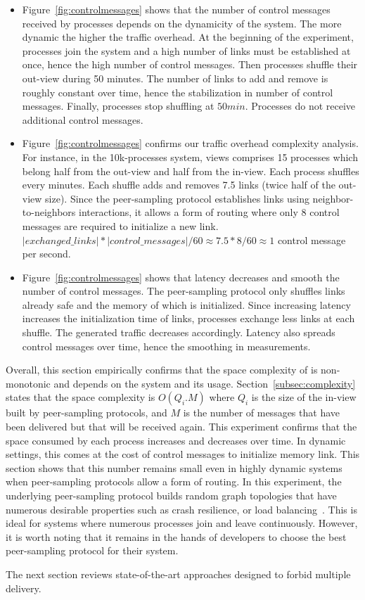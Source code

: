 \begin{itemize}
\item Figure~\ref{fig:controlmessages} shows that the number of control messages
  received by processes depends on the dynamicity of the system. The more
  dynamic the higher the traffic overhead. At the beginning of the experiment,
  processes join the system and a high number of links must be established at
  once, hence the high number of control messages. Then processes shuffle their
  out-view during 50 minutes. The number of links to add and remove is roughly
  constant over time, hence the stabilization in number of control
  messages. Finally, processes stop shuffling at $50min$. Processes do not
  receive additional control messages.
\item Figure~\ref{fig:controlmessages} confirms our traffic overhead complexity
  analysis. For instance, in the 10k-processes system, views comprises 15
  processes which belong half from the out-view and half from the in-view.  Each
  process shuffles every minutes. Each shuffle adds and removes 7.5 links (twice
  half of the out-view size). Since the peer-sampling protocol establishes links
  using neighbor-to-neighbors interactions, it allows a form of routing where
  only 8 control messages are required to initialize a new link.
  $|exchanged\_links|*|control\_messages|/60 \approx 7.5*8/60 \approx 1$ control
  message per second.
\item Figure~\ref{fig:controlmessages} shows that latency decreases and smooth
  the number of control messages. The peer-sampling protocol only shuffles links
  already safe and the memory of which is initialized. Since increasing latency
  increases the initialization time of links, processes exchange less links at
  each shuffle. The generated traffic decreases accordingly. Latency also
  spreads control messages over time, hence the smoothing in measurements.
\end{itemize}

Overall, this section empirically confirms that the space complexity of
\RPCBROADCAST is non-monotonic and depends on the system and its
usage. Section~\ref{subsec:complexity} states that the space complexity is
$O(Q_i.M)$ where $Q_i$ is the size of the in-view built by peer-sampling
protocols, and $M$ is the number of messages that have been delivered but that
will be received again. This experiment confirms that the space consumed by each
process increases and decreases over time. In dynamic settings, this comes at
the cost of control messages to initialize memory link. This section shows that
this number remains small even in highly dynamic systems when peer-sampling
protocols allow a form of routing.  In this experiment, the underlying
peer-sampling protocol builds random graph topologies that have numerous
desirable properties such as crash resilience, or load
balancing~\cite{jelasity2007gossip}. This is ideal for systems where numerous
processes join and leave continuously. However, it is worth noting that it
remains in the hands of developers to choose the best peer-sampling protocol for
their system.


The next section reviews state-of-the-art approaches designed to forbid multiple
delivery.




